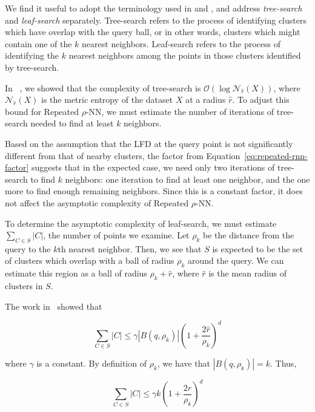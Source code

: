 We find it useful to adopt the terminology used in \cite{ishaq2019clustered} and \cite{yu2015entropy}, and address \emph{tree-search} and \emph{leaf-search} separately.
Tree-search refers to the process of identifying clusters which have overlap with the query ball, or in other words, clusters which might contain one of the $k$ nearest neighbors. 
Leaf-search refers to the process of identifying the $k$ nearest neighbors among the points in those clusters identified by tree-search.

In ~\cite{ishaq2019clustered}, we showed that the complexity of tree-search is $\mathcal{O}(\log\mathcal{N}_{\hat{r}}(X))$, where $\mathcal{N}_{\hat{r}}(X)$ is the metric entropy of the dataset $X$ at a radius $\hat{r}$.
To adjust this bound for Repeated $\rho$-NN, we must estimate the number of iterations of tree-search needed to find at least $k$ neighbors.

Based on the assumption that the LFD at the query point is not significantly different from that of nearby clusters, the factor from Equation~\ref{eq:repeated-rnn-factor} suggests that in the expected case, we need only two iterations of tree-search to find $k$ neighbors:
one iteration to find at least one neighbor, and the one more to find enough remaining neighbors.
Since this is a constant factor, it does not affect the asymptotic complexity of Repeated $\rho$-NN.

To determine the asymptotic complexity of leaf-search, we must estimate $\sum_{C \in S} |C|$, the number of points we examine.
Let $\rho_k$ be the distance from the query to the $k$th nearest neighbor.
Then, we see that $S$ is expected to be the set of clusters which overlap with a ball of radius $\rho_k$ around the query.
We can estimate this region as a ball of radius $\rho_k + \hat{r}$, where $\hat{r}$ is the mean radius of clusters in $S$.

The work in~\cite{yu2015entropy} showed that

\begin{equation*}
    \sum_{C \in S} |C| \leq \gamma  \left| B(q, \rho_k) \right| \left(1+ \frac{2\hat{r}}{\rho_k} \right)^d
\end{equation*}

where $\gamma$ is a constant. 
By definition of $\rho_k$, we have that $|B(q, \rho_k)| = k$.
Thus,

\begin{equation}
    \sum_{C \in S} |C| \leq \gamma k \left( 1+ \frac{2\hat{r}}{\rho_k} \right)^d
    \label{eq:methods:repeated-rnn-leaf-search}
\end{equation}

